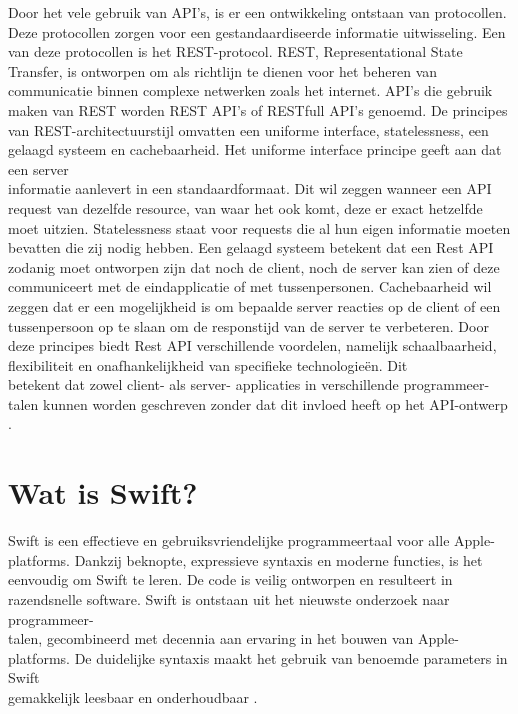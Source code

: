 Door het vele gebruik van API’s, is er een ontwikkeling ontstaan van protocollen. Deze protocollen zorgen voor een gestandaardiseerde informatie uitwisseling. Een van deze protocollen is het REST-protocol. REST, Representational State Transfer, is ontworpen om als richtlijn te dienen voor het beheren van communicatie binnen complexe netwerken zoals het internet. API’s die gebruik maken van REST worden REST API’s of RESTfull API’s genoemd. De principes van REST-architectuurstijl omvatten een uniforme interface, statelessness, een gelaagd systeem en cachebaarheid. Het uniforme interface principe geeft aan dat een server \\informatie aanlevert in een standaardformaat. Dit wil zeggen wanneer een API \\request van dezelfde resource, van waar het ook komt, deze er exact hetzelfde moet uitzien. Statelessness staat voor requests die al hun eigen informatie moeten \\bevatten die zij nodig hebben. Een gelaagd systeem betekent dat een Rest API zodanig moet ontworpen zijn dat noch de client, noch de server kan zien of deze communiceert met de eindapplicatie of met  tussenpersonen. Cachebaarheid wil zeggen dat er een mogelijkheid is om bepaalde server reacties op de client of een tussenpersoon op te slaan om de responstijd van de server te verbeteren. Door deze principes biedt Rest API verschillende voordelen, namelijk schaalbaarheid, flexibiliteit en onafhankelijkheid van specifieke technologieën. Dit \\betekent dat zowel client- als server- applicaties in verschillende programmeer-\\talen kunnen worden geschreven zonder dat dit invloed heeft op het API-ontwerp \autocite{IBM}. 

\section{Wat is Swift?}

Swift is een effectieve en gebruiksvriendelijke programmeertaal voor alle Apple-platforms. Dankzij beknopte, expressieve syntaxis en moderne functies, is het \\eenvoudig om Swift te leren. De code is veilig ontworpen en resulteert in razendsnelle software. 
Swift is ontstaan uit het nieuwste onderzoek naar programmeer-\\talen, gecombineerd met decennia aan ervaring in het bouwen van Apple-platforms. De duidelijke syntaxis maakt het gebruik van benoemde parameters in Swift \\gemakkelijk leesbaar en onderhoudbaar \autocite{Swift}. 

